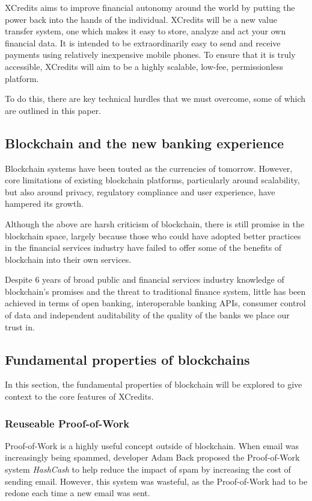 \documentclass[a4paper,12pt]{article}
\begin{document}
XCredits aims to improve financial autonomy around the world by putting the power back into the hands of the individual. XCredits will be a new value transfer system, one which makes it easy to store, analyze and act your own financial data. It is intended to be extraordinarily easy to send and receive payments using relatively inexpensive mobile phones. To ensure that it is truly accessible, XCredits will aim to be a highly scalable, low-fee, permissionless platform.

To do this, there are key technical hurdles that we must overcome, some of which are outlined in this paper.

\subsection{Blockchain and the new banking experience}
Blockchain systems have been touted as the currencies of tomorrow. However, core limitations of existing blockchain platforms, particularly around scalability, but also around privacy, regulatory compliance and user experience, have hampered its growth. 

Although the above are harsh criticism of blockchain, there is still promise in the blockchain space, largely because those who could have adopted better practices in the financial services industry have failed to offer some of the benefits of blockchain into their own services.

Despite 6 years of broad public and financial services industry knowledge of blockchain's promises and the threat to traditional finance system, little has been achieved in terms of open banking, interoperable banking APIs, consumer control of data and independent auditability of the quality of the banks we place our trust in. 

\subsection{Fundamental properties of blockchains}
In this section, the fundamental properties of blockchain will be explored to give context to the core features of XCredits. 

\subsubsection{Reuseable Proof-of-Work}
Proof-of-Work is a highly useful concept outside of blockchain. When email was increasingly being spammed, developer Adam Back proposed the Proof-of-Work system \textit{HashCash} to help reduce the impact of spam by increasing the cost of sending email. However, this system was wasteful, as the Proof-of-Work had to be redone each time a new email was sent.
\end{document}
